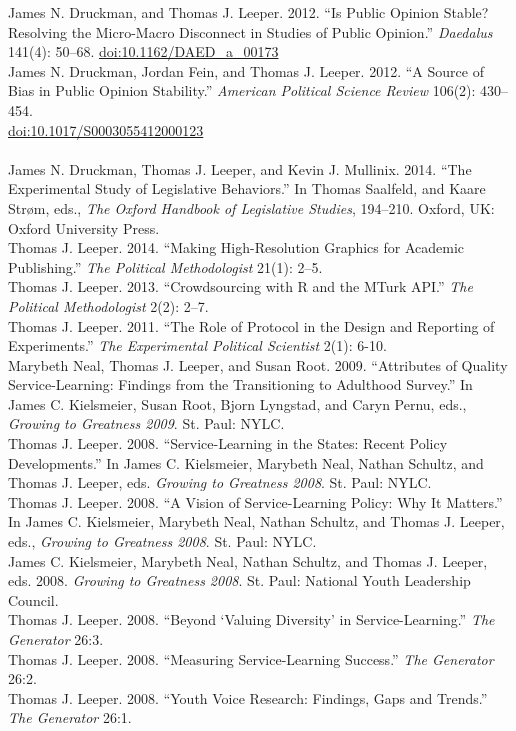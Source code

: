 \documentclass[12pt]{article}
\newcommand{\topic}[1]{\pagebreak[3]\indent {\color{lg}{\footnotesize #1 }}\\}
\newcommand{\entry}[1]{\indent {\color{lg}\guillemotright}\hspace{2pt}#1\vspace{.25em}\\}
\begin{document}
\entry{James N. Druckman, and Thomas J. Leeper. 2012. ``Is Public Opinion Stable? Resolving the Micro-Macro Disconnect in Studies of Public Opinion.'' {\em Daedalus} 141(4): 50--68. \href{http://dx.doi.org/10.1162/DAED\_a\_00173}{doi:10.1162/DAED\_a\_00173}}
\entry{James N. Druckman, Jordan Fein, and Thomas J. Leeper. 2012. ``A Source of Bias in Public Opinion Stability.'' {\em American Political Science Review} 106(2): 430--454.\\ \href{http://dx.doi.org/10.1017/S0003055412000123}{doi:10.1017/S0003055412000123}}

\topic{Other Publications}
\entry{James N. Druckman, Thomas J. Leeper, and Kevin J. Mullinix. 2014. ``The Experimental Study of Legislative Behaviors.'' In Thomas Saalfeld, and Kaare Str\o m, eds., {\em The Oxford Handbook of Legislative Studies}, 194--210. Oxford, UK: Oxford University Press.}
\entry{Thomas J. Leeper. 2014. ``Making High-Resolution Graphics for Academic Publishing.'' {\em The Political Methodologist} 21(1): 2--5.}
\entry{Thomas J. Leeper. 2013. ``Crowdsourcing with R and the MTurk API.'' {\em The Political Methodologist} 2(2): 2--7.}
\entry{Thomas J. Leeper. 2011. ``The Role of Protocol in the Design and Reporting of Experiments.'' {\em The Experimental Political Scientist} 2(1): 6-10.}%
\entry{Marybeth Neal, Thomas J. Leeper, and Susan Root. 2009. ``Attributes of Quality Service-Learning: Findings from the Transitioning to Adulthood Survey.'' In James C. Kielsmeier, Susan Root, Bjorn Lyngstad, and Caryn Pernu, eds., {\em Growing to Greatness 2009}. St. Paul: NYLC.}
\entry{Thomas J. Leeper. 2008. ``Service-Learning in the States: Recent Policy Developments.'' In James C. Kielsmeier, Marybeth Neal, Nathan Schultz, and Thomas J. Leeper, eds. {\em Growing to Greatness 2008}. St. Paul: NYLC.}
\entry{Thomas J. Leeper. 2008. ``A Vision of Service-Learning Policy: Why It Matters.'' In James C. Kielsmeier, Marybeth Neal, Nathan Schultz, and Thomas J. Leeper, eds., {\em Growing to Greatness 2008}. St. Paul: NYLC.}
\entry{James C. Kielsmeier, Marybeth Neal, Nathan Schultz, and Thomas J. Leeper, eds. 2008. {\em Growing to Greatness 2008}. St. Paul: National Youth Leadership Council.}
\entry{Thomas J. Leeper. 2008. ``Beyond `Valuing Diversity' in Service-Learning.'' {\em The Generator} 26:3.}
\entry{Thomas J. Leeper. 2008. ``Measuring Service-Learning Success.'' {\em The Generator} 26:2.}
\entry{Thomas J. Leeper. 2008. ``Youth Voice Research: Findings, Gaps and Trends.'' {\em The Generator} 26:1.}
\end{document}
